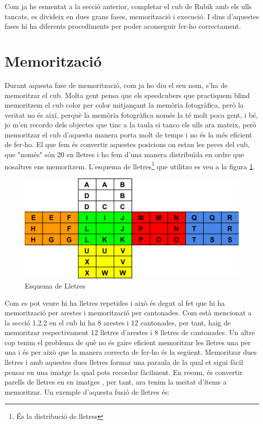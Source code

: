 Com ja he esmentat a la secció anterior, completar el cub de Rubik amb els ulls tancats, es divideix en dues grans fases, memorització i execució. I dins d'aquestes fases hi ha diferents procediments per poder aconseguir fer-ho correctament.

\section{Memorització}

Durant aquesta fase de memorització, com ja ho diu el seu nom, s'ha de memoritzar el cub. Molta gent pensa que els speedcubers que practiquem blind memoritzem el cub color per color mitjançant la memòria fotogràfica, però la veritat no és així, perquè la memòria fotogràfica només la té molt poca gent, i bé, jo m'en recordo dels objectes que tinc a la taula si tanco els ulls ara mateix, però memoritzar el cub d'aquesta manera porta molt de temps i no és la més eficient de fer-ho.
El que fem és convertir aquestes posicions on estan les peces del cub, que "només" són 20 en lletres i ho fem d'una manera distribuïda en ordre que nosaltres ens memoritzem. L'esquema de lletres\footnote{És la distribució de lletres} que utilitzo es veu a la figura \ref{fig:letter-scheme}.

\begin{figure}[ht]
    \centering
    \includegraphics[width=12cm]{img/figures/letter-scheme.png}
\caption{Esquema de Lletres}
    \label{fig:letter-scheme}
\end{figure}

Com es pot veure hi ha lletres repetides i això és degut al fet que hi ha memorització per arestes i memorització per cantonades. Com està mencionat a la secció 1.2.2 en el cub hi ha 8 arestes i 12 cantonades, per tant, haig de memoritzar respectivament 12 lletres d'arestes i 8 lletres de cantonades.
Un altre cop tenim el problema de què no és gaire eficient memoritzar les lletres una per una i és per això que la manera correcta de fer-ho és la següent. Memoritzar dues lletres i amb aquestes dues lletres formar una paraula de la qual et sigui fàcil pensar en una imatge la qual pots recordar fàcilment. En resum, és convertir parells de lletres en en imatges \cite{memorizacomosherlock} \cite{tecnicasmemoriaveloz}, per tant, ara tenim la meitat d'ítems a memoritzar. Un exemple d'aquesta fusió de lletres és: 
\vspace{0.25cm}

